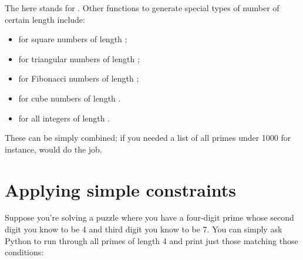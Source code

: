 \documentclass[letterpaper,10pt,english]{sphinxmanual}
\begin{document}
\begin{sphinxVerbatim}[commandchars=\\\{\}]
                    
\end{sphinxVerbatim}

The  here stands for . Other functions to generate special types of number of certain length include:
\begin{itemize}
\item {} 
 for square numbers of length ;

\item {} 
 for triangular numbers of length ;

\item {} 
 for Fibonacci numbers of length ;

\item {} 
 for cube numbers of length .

\item {} 
 for all integers of length .

\end{itemize}

These can be simply combined; if you needed a list of all primes under 1000 for instance,  would do the job.


\section{Applying simple constraints}
\label{\detokenize{index:applying-simple-constraints}}
Suppose you’re solving a puzzle where you have a four-digit prime whose second digit you know to be 4 and third digit you know to be 7. You can simply ask Python to run through all primes of length 4 and print just those matching those conditions:
\end{document}
